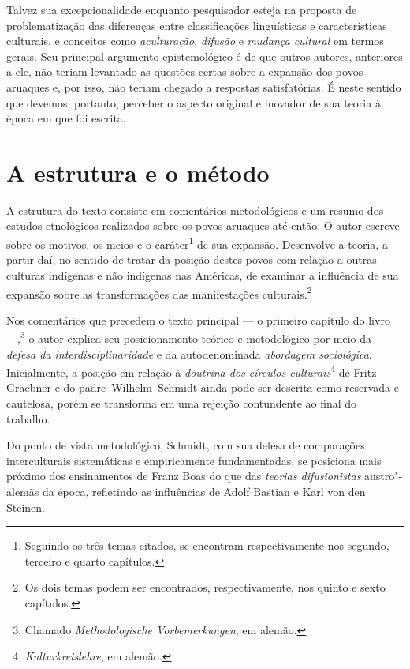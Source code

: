 Talvez sua excepcionalidade enquanto pesquisador esteja na proposta de problematização das diferenças entre classificações linguísticas e características culturais, e conceitos como \textit{aculturação}, \textit{difusão} e \textit{mudança cultural} em termos gerais. Seu principal argumento epistemológico é de que outros autores, anteriores a ele, não teriam levantado as questões certas sobre a expansão dos povos aruaques e, por isso, não teriam chegado a respostas satisfatórias. É neste sentido que devemos, portanto, perceber o aspecto original e inovador de sua teoria à época em que foi escrita.

\section{A estrutura e o método}

A estrutura do texto consiste em comentários metodológicos e um resumo dos estudos etnológicos realizados sobre os povos aruaques até então. O autor escreve sobre os motivos, os meios e o caráter\footnote{Seguindo os três temas citados, se encontram respectivamente nos segundo, terceiro e quarto capítulos.} de sua expansão. Desenvolve a teoria, a partir daí, no sentido de tratar da posição destes povos com relação a outras culturas indígenas e não indígenas nas Américas, de examinar a influência de sua expansão sobre as transformações das manifestações culturais.\footnote{Os dois temas podem ser encontrados, respectivamente, nos quinto e sexto capítulos.} 

Nos comentários que precedem o texto principal --- o primeiro capítulo do livro ---,\footnote{Chamado \textit{Methodologische Vorbemerkungen}, em alemão.} o autor explica seu posicionamento teórico e metodológico por meio da \emph{defesa da interdisciplinaridade} e da autodenominada \emph{abordagem sociológica}. Inicialmente, a posição em relação à \textit{doutrina dos círculos culturais}\footnote{\textit{Kulturkreislehre}, em alemão.} de Fritz Graebner e do padre~Wilhelm~Schmidt ainda pode ser descrita como reservada e cautelosa, porém se transforma em uma rejeição contundente ao final do trabalho. 

Do ponto de vista metodológico, Schmidt, com sua defesa de comparações interculturais sistemáticas e empiricamente fundamentadas, se posiciona mais próximo dos ensinamentos de Franz Boas do que das \textit{teorias difusionistas} austro"-alemãs da época, refletindo as influências de Adolf Bastian e Karl von den Steinen.

